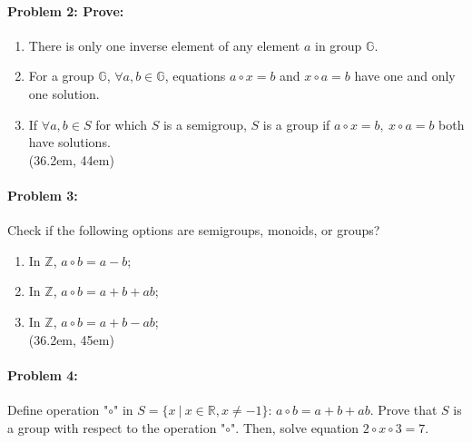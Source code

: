 \documentclass[12pt]{scrartcl}
\begin{document}
{{%
\paragraph*{Problem 2: Prove:}

	\begin{enumerate}[label=\arabic*)]
	
	\item There is only one inverse element of any element $a$ in group $\mathbb{G}$.
	\item For a group $\mathbb{G}$, $\forall a, b \in \mathbb{G}$, equations $a \circ x = b$ and $x \circ a = b$ have one and only one solution.
	\item If $\forall a, b \in S$ for which $S$ is a semigroup, $S$ is a group if $a \circ x = b, ~ x \circ a = b$ both have solutions.\\

	\framebox(36.2em, 44em){}

	\end{enumerate}

\newpage


\paragraph*{Problem 3:} Check if the following options are semigroups, monoids, or groups?

	\begin{enumerate}[label=\arabic*)]
	
	\item In $\mathbb{Z}$, $a \circ b = a - b$;

	\item In $\mathbb{Z}$, $a \circ b = a + b + ab$;

	\item In $\mathbb{Z}$, $a \circ b = a + b - ab$;\\

	\framebox(36.2em, 45em){}

	\end{enumerate}

	\newpage

\paragraph*{Problem 4:}

	\begin{spacing}{1.2}Define operation "$\circ$" in $S=\{x ~ | ~ x \in \mathbb{R}, x \neq -1\}$: $a \circ b = a+ b+ ab$. Prove that $S$ is a group with respect to the operation "$\circ$". Then, solve equation $2 \circ x \circ 3 = 7$.\end{spacing}

}}
\end{document}
